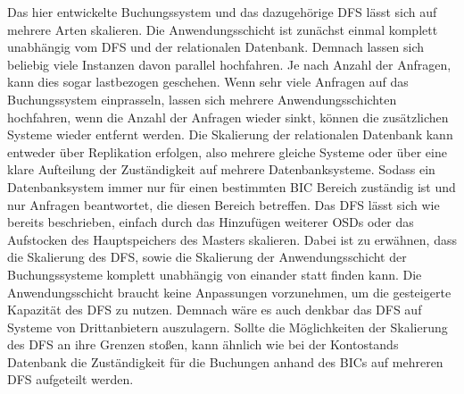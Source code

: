 \documentclass[12pt,oneside,a4paper,parskip]{scrbook}
\begin{document}
Das hier entwickelte Buchungssystem und das dazugehörige DFS lässt sich auf mehrere Arten skalieren. Die Anwendungsschicht ist zunächst einmal komplett unabhängig vom DFS und der relationalen Datenbank. Demnach lassen sich beliebig viele Instanzen davon parallel hochfahren. Je nach Anzahl der Anfragen, kann dies sogar lastbezogen geschehen. Wenn sehr viele Anfragen auf das Buchungssystem einprasseln, lassen sich mehrere Anwendungsschichten hochfahren, wenn die Anzahl der Anfragen wieder sinkt, können die zusätzlichen Systeme wieder entfernt werden. Die Skalierung der relationalen Datenbank kann entweder über Replikation erfolgen, also mehrere gleiche Systeme oder über eine klare Aufteilung der Zuständigkeit auf mehrere Datenbanksysteme. Sodass ein Datenbanksystem immer nur für einen bestimmten BIC Bereich zuständig ist und nur Anfragen beantwortet, die diesen Bereich betreffen. Das DFS lässt sich wie bereits beschrieben, einfach durch das Hinzufügen weiterer OSDs oder das Aufstocken des Hauptspeichers des Masters skalieren. Dabei ist zu erwähnen, dass die Skalierung des DFS, sowie die Skalierung der Anwendungsschicht der Buchungssysteme komplett unabhängig von einander statt finden kann. Die Anwendungsschicht braucht keine Anpassungen vorzunehmen, um die gesteigerte Kapazität des DFS zu nutzen. Demnach wäre es auch denkbar das DFS auf Systeme von Drittanbietern auszulagern. Sollte die Möglichkeiten der Skalierung des DFS an ihre Grenzen stoßen, kann ähnlich wie bei der Kontostands Datenbank die Zuständigkeit für die Buchungen anhand des BICs auf mehreren DFS aufgeteilt werden.
\end{document}
